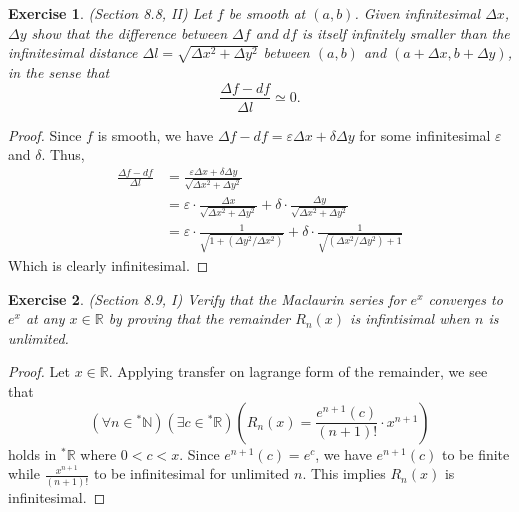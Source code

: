 \documentclass[a4paper, 11pt, openany]{book}
\theoremstyle{plain}
\newtheorem{exercise}{Exercise}[chapter]
\theoremstyle{plain}
\newcommand{\N}{\mathbb{N}}
\newcommand{\R}{\mathbb{R}}
\newcommand{\ep}{\varepsilon}
\newcommand{\del}{\delta}
\newcommand{\hyp}{{}^*}
\newcommand{\Del}{\Delta}
\begin{document}
    \begin{exercise}
      (Section 8.8, II)
      Let $f$ be smooth at $(a,b)$. Given infinitesimal $\Delta x$, $\Delta y$ show that the difference between $\Delta f$ and $df$ is itself infinitely smaller than the infinitesimal distance $\Del l=\sqrt{\Del x^2+\Del y^2}$ between $(a,b)$ and $(a+\Del x, b+ \Del y)$, in  the sense that $$\frac{\Del f-df}{\Del l} \simeq 0.$$
    \end{exercise}
    \begin{proof}
      Since $f$ is smooth, we have $\Del f -df=\ep \Del x + \del \Del y$ for some infinitesimal $\ep$ and $\del$. Thus, 
      \begin{align*}
        \frac{\Del f -df}{\Del l} &= \frac{\ep \Del x+\del \Del y}{\sqrt{\Del x^2+\Del y^2}} \\
        &=\ep \cdot \frac{\Del x}{\sqrt{\Del x^2 + \Del y^2}}+ \del \cdot \frac{\Del y}{\sqrt{\Del x^2 + \Del y^2}} \\
        &= \ep \cdot \frac{1}{\sqrt{1 + (\Del y^2/\Del x^2)}}+ \del \cdot \frac{1}{\sqrt{(\Del x^2/\Del y^2) + 1}}
      \end{align*}
      Which is clearly infinitesimal.
    \end{proof}

    \begin{exercise}
      (Section 8.9, I)
      Verify that the Maclaurin series for $e^x$ converges to $e^x$ at any $x \in \R$ by proving that the remainder $R_n(x)$ is infintisimal when $n$ is unlimited.
    \end{exercise}
    \begin{proof}
      Let $x \in \R$. Applying transfer on lagrange form of the remainder, we see that $$(\forall n \in \hyp \N)\left(\exists c \in \hyp \R \right)(R_n(x)=\frac{e^{n+1}(c)}{(n+1)!} \cdot x^{n+1})$$ holds in $\hyp \R$ where $0<c<x$. Since $e^{n+1}(c)=e^c$, we have $e^{n+1}(c)$ to be finite while $\frac{x^{n+1}}{(n+1)!}$ to be infinitesimal for unlimited $n$. This implies $R_n(x)$ is infinitesimal.
    \end{proof}
\end{document}
